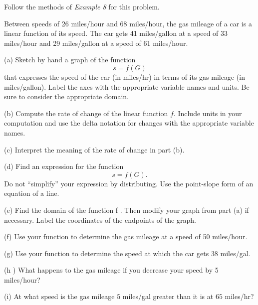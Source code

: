 \documentclass{ximera}
\begin{document}
\begin{question}  \label{Q324fggg}
Follow the methods of \emph{Example 8} for this problem.

Between speeds of 26 miles/hour and 68 miles/hour, the gas mileage of a car is a linear function of its speed. The car gets 41 miles/gallon at a speed of 33 miles/hour and 29 miles/gallon at a speed of 61 miles/hour.

(a) Sketch by hand a graph of the function 
\[
      s = f (G)
\]
that expresses the speed of the car (in miles/hr) in terms of its gas mileage (in miles/gallon). Label the axes with the appropriate variable names and units. Be sure to consider the appropriate domain.

(b) Compute the rate of change of the linear function $f$. Include units in your computation and use the delta notation for changes with the appropriate variable names. 

(c)  Interpret the meaning of the rate of change in part (b). 

(d) Find an expression for the function 
\[
   s = f (G). 
\]
Do not “simplify” your expression by distributing. Use the point-slope form of an equation of a line.

(e) Find the domain of the function f . Then modify your graph from part (a) if necessary. Label the coordinates of the endpoints of the graph.


(f) Use your function to determine the gas mileage at a speed of 50 miles/hour.

(g) Use  your function to determine the speed at which the car gets $38$ miles/gal.

(h ) What happens to the gas mileage if you decrease your speed by 5 miles/hour?

(i) At what speed is the gas mileage $5$ miles/gal greater than it is at $65$ miles/hr?


\end{question}
\end{document}
